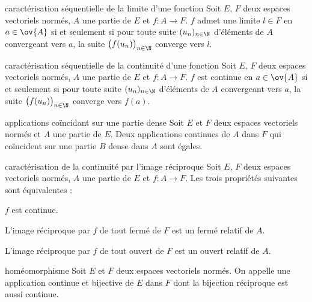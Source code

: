 \begin{adjustwidth}{-3cm}{-3cm}
\begin{theoreme}{4.46}{caractérisation séquentielle de la limite d'une fonction}
    Soit $E$, $F$ deux espaces vectoriels normés, $A$ une partie de $E$ et $f : A \to F$. $f$ admet une limite $l\in F$ en $a \in \ov{A}$ si et seulement si pour toute suite $(u_n)_{n\in \N}$ d’éléments de $A$ convergeant vers $a$, la suite $\big(f(u_n)\big)_{n\in \N}$ converge vers $l$.
\end{theoreme}

\begin{theoreme}{4.47}{caractérisation séquentielle de la continuité d'une fonction}
    Soit $E$, $F$ deux espaces vectoriels normés, $A$ une partie de $E$ et $f : A \to F$. $f$ est continue en $a \in \ov{A}$ si et seulement si pour toute suite $(u_n)_{n\in \N}$ d’éléments de $A$ convergeant vers $a$, la suite $\big(f(u_n)\big)_{n\in \N}$ converge vers $f(a)$.
\end{theoreme}

\begin{theoreme}{4.55}{applications coïncidant sur une partie dense}
    Soit $E$ et $F$ deux espaces vectoriels normés et $A$ une partie de $E$. Deux applications continues de $A$ dans $F$ qui coïncident sur une partie $B$ dense dans $A$ sont égales.
\end{theoreme}

\begin{theoreme}{4.56}{caractérisation de la continuité par l'image réciproque}
    Soit $E$, $F$ deux espaces vectoriels normés, $A$ une partie de $E$ et $f : A \to F$. Les trois propriétés suivantes sont équivalentes :
    \begin{enumeratebf}
        \item $f$ est continue.
        \item L’image réciproque par $f$ de tout fermé de $F$ est un fermé relatif de $A$.
        \item  L’image réciproque par $f$ de tout ouvert de $F$ est un ouvert relatif de $A$.
    \end{enumeratebf}
\end{theoreme}

\begin{definition}{4.59}{homéomorphisme}
    Soit $E$ et $F$ deux espaces vectoriels normés. On appelle  une application continue et bijective de $E$ dans $F$ dont la bijection réciproque est aussi continue.
\end{definition}


\end{adjustwidth}
